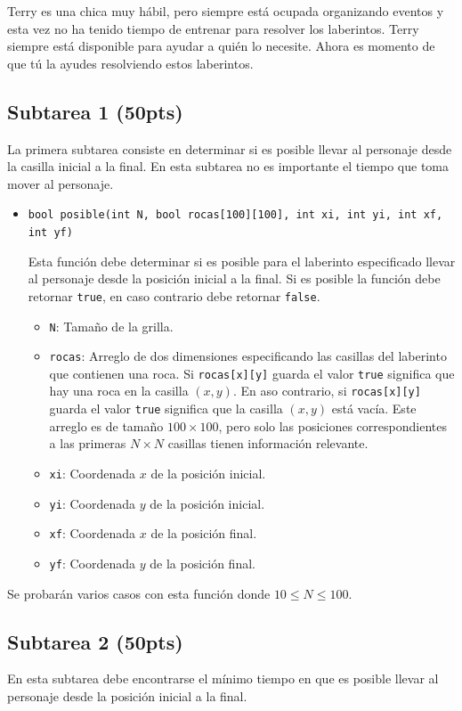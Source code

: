 \documentclass{oci}
\begin{document}
Terry es una chica muy hábil, pero siempre está ocupada organizando eventos y esta vez no ha tenido tiempo de entrenar para resolver los laberintos.
Terry siempre está disponible para ayudar a quién lo necesite.
Ahora es momento de que tú la ayudes resolviendo estos laberintos.

\subsection*{Subtarea 1 (50pts)}
La primera subtarea consiste en determinar si es posible llevar al personaje desde la casilla inicial a la final.
En esta subtarea no es importante el tiempo que toma mover al personaje.

\begin{itemize}
	\item \verb+bool posible(int N, bool rocas[100][100], int xi, int yi, int xf, int yf)+

Esta función debe determinar si es posible para el laberinto especificado llevar al personaje desde la posición inicial a la final.
  Si es posible la función debe retornar \texttt{true}, en caso contrario debe retornar \texttt{false}.
  \begin{itemize}
    \item \verb+N+: Tamaño de la grilla.
    \item \verb+rocas+: Arreglo de dos dimensiones especificando las casillas del laberinto que contienen una roca.
      Si \verb+rocas[x][y]+ guarda el valor \verb+true+ significa que hay una roca en la casilla $(x,y)$.
      En aso contrario, si \verb+rocas[x][y]+ guarda el valor \verb+true+ significa que la casilla $(x,y)$ está vacía.
      Este arreglo es de tamaño $100\times 100$, pero solo las posiciones correspondientes a las primeras $N\times N$ casillas tienen información relevante.
    \item \verb+xi+: Coordenada $x$ de la posición inicial.
    \item \verb+yi+: Coordenada $y$ de la posición inicial.
    \item \verb+xf+: Coordenada $x$ de la posición final.
    \item \verb+yf+: Coordenada $y$ de la posición final.
  \end{itemize}
\end{itemize}

Se probarán varios casos con esta función donde $10 \leq N\leq 100$.

\subsection*{Subtarea 2 (50pts)}
En esta subtarea debe encontrarse el mínimo tiempo en que es posible llevar al personaje desde la posición inicial a la final.
\end{document}
